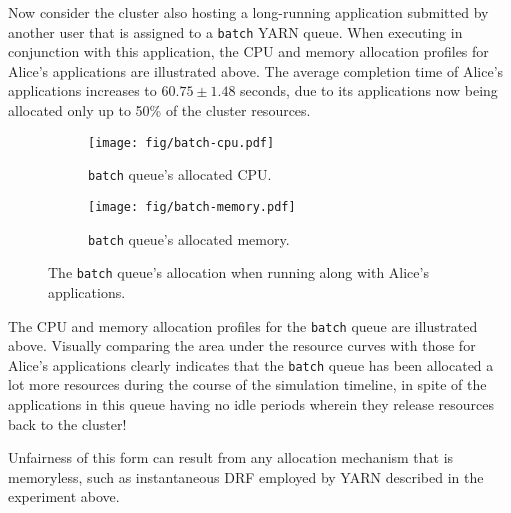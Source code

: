 Now consider the cluster also hosting a long-running application
submitted by another user that is assigned to a \texttt{batch}
YARN queue. When executing in conjunction with this application,
the CPU and memory allocation profiles for Alice's applications are
illustrated above. The average completion time of Alice's applications
increases to $60.75 \pm 1.48$ seconds, due to its applications now
being allocated only up to 50\% of the cluster resources.

\begin{figure}[h!]
	\centering
	\begin{subfigure}{0.45\textwidth}
		\texttt{[image: fig/batch-cpu.pdf]}
		\caption{\texttt{batch} queue's allocated CPU.}
	\end{subfigure}
	\begin{subfigure}{0.45\textwidth}
		\texttt{[image: fig/batch-memory.pdf]}
		\caption{\texttt{batch} queue's allocated memory.}
	\end{subfigure}
	\caption{The \texttt{batch} queue's allocation when running
		along with Alice's applications.}
	\label{fig:batch-allocations}
\end{figure}

The CPU and memory allocation profiles for the \texttt{batch} queue are
illustrated above. Visually comparing the area under the resource
curves with those for Alice's applications clearly indicates that the
\texttt{batch} queue has been allocated a lot more resources during
the course of the simulation timeline, in spite of the
applications in this queue having no idle periods wherein they
release resources back to the cluster!

Unfairness of this form can result from any allocation mechanism that
is memoryless, such as instantaneous DRF employed by YARN described
in the experiment above.